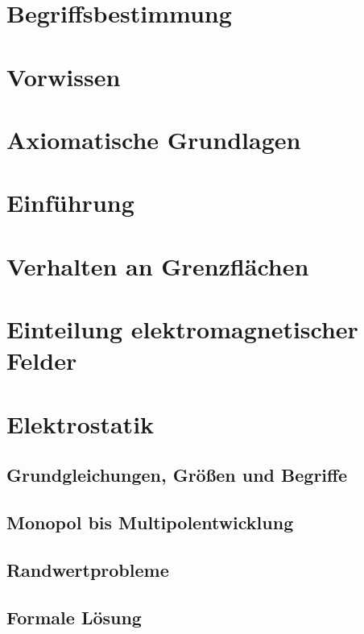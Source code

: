 
\usepackage{pdfpages}


\section{Begriffsbestimmung}

\section{Vorwissen}

\section{Axiomatische Grundlagen}

\section{Einführung}

\section{Verhalten an Grenzflächen}

\section{Einteilung elektromagnetischer Felder}

\section{Elektrostatik}
\subsection{Grundgleichungen, Größen und Begriffe}

\subsection{Monopol bis Multipolentwicklung}

\subsection{Randwertprobleme}

\subsection{Formale Lösung}

